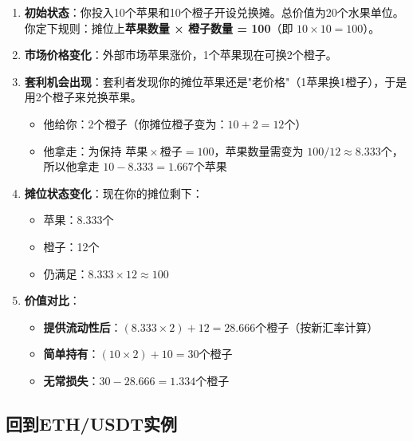 \documentclass[12pt]{ctexart}
\begin{document}
\begin{enumerate}
    \item \textbf{初始状态}：你投入10个苹果和10个橙子开设兑换摊。总价值为20个水果单位。你定下规则：摊位上\textbf{苹果数量 × 橙子数量 = 100}（即 $10 \times 10 = 100$）。
    
    \item \textbf{市场价格变化}：外部市场苹果涨价，1个苹果现在可换2个橙子。
    
    \item \textbf{套利机会出现}：套利者发现你的摊位苹果还是"老价格"（1苹果换1橙子），于是用2个橙子来兑换苹果。
    \begin{itemize}
        \item 他给你：2个橙子（你摊位橙子变为：$10 + 2 = 12$个）
        \item 他拿走：为保持 $苹果 \times 橙子 = 100$，苹果数量需变为 $100 / 12 \approx 8.333$个，所以他拿走 $10 - 8.333 = 1.667$个苹果
    \end{itemize}
    
    \item \textbf{摊位状态变化}：现在你的摊位剩下：
    \begin{itemize}
        \item 苹果：8.333个
        \item 橙子：12个
        \item 仍满足：$8.333 \times 12 \approx 100$
    \end{itemize}
    
    \item \textbf{价值对比}：
    \begin{itemize}
        \item \textbf{提供流动性后}：$(8.333 \times 2) + 12 = 28.666$个橙子（按新汇率计算）
        \item \textbf{简单持有}：$(10 \times 2) + 10 = 30$个橙子
        \item \textbf{无常损失}：$30 - 28.666 = 1.334$个橙子
    \end{itemize}
\end{enumerate}

\subsection{回到ETH/USDT实例}
\end{document}
